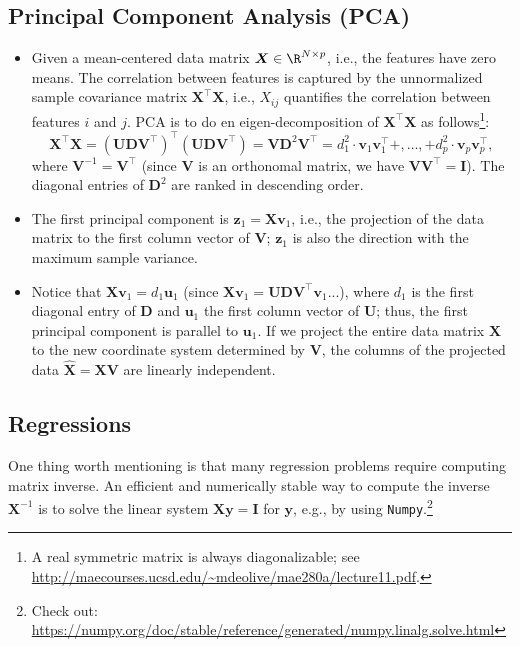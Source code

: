 \subsection{Principal Component Analysis (PCA)}
    \begin{itemize}
        \item Given a mean-centered data matrix $\bm{X} \in \R^{\ndata \times \nfeat}$, i.e., the features have zero means.
        The correlation between features is captured by the unnormalized sample covariance matrix $\bm{X}^\top \bm{X}$, i.e., $X_{ij}$ quantifies the correlation between features $i$ and $j$.
        PCA is to do en  eigen-decomposition of $\bm{X}^\top \bm{X}$ as follows\footnote{A real symmetric matrix is always diagonalizable; see \url{http://maecourses.ucsd.edu/~mdeolive/mae280a/lecture11.pdf}.}:
            \begin{equation}
                \bm{X}^\top \bm{X} = \left( \bm{U}\bm{D}\bm{V}^\top \right)^\top \left( \bm{U}\bm{D}\bm{V}^\top \right) = \bm{V} \bm{D}^2 \bm{V}^\top = d_1^2 \cdot \bm{v}_1 \bm{v}_1^\top +, \ldots, +  d_p^2 \cdot \bm{v}_p \bm{v}_p^\top,
            \end{equation}
        where $\bm{V}^{-1} = \bm{V}^\top$ (since $\bm{V}$ is an orthonomal matrix, we have $\bm{V} \bm{V}^\top = \bm{I}$). 
        The diagonal entries of $\bm{D}^2$ are ranked in descending order.
        \item The first principal component is $\bm{z}_1 = \bm{X} \bm{v}_1$, i.e., the projection of the data matrix to the first column vector of $\bm{V}$; $\bm{z}_1$ is also the direction with the maximum sample variance.
        
        \item Notice that $\bm{X} \bm{v}_1 = d_1 \bm{u}_1$ (since $\bm{X} \bm{v}_1 = \bm{U} \bm{D} \bm{V}^\top \bm{v}_1$...), where $d_1$ is the first diagonal entry of $\bm{D}$ and $\bm{u}_1$ the first column vector of $\bm{U}$; thus, the first principal component is parallel to $\bm{u}_1$.
        If we project the entire data matrix $\bm{X}$ to the new coordinate system determined by $\bm{V}$, the columns of the projected data $\hat{\bm{X}} = \bm{X} \bm{V}$ are linearly independent.
    \end{itemize}


\subsection{Regressions}
    One thing worth mentioning is that many regression problems require computing matrix inverse.
    An efficient and numerically stable way to compute the inverse $\bm{X}^{-1}$ is to solve the linear system $\bm{X} \bm{y} = \bm{I}$ for $\bm{y}$, e.g., by using \texttt{Numpy}.\footnote{Check out: \url{https://numpy.org/doc/stable/reference/generated/numpy.linalg.solve.html}}
    
